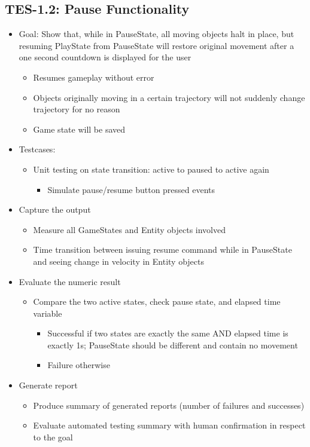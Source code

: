 \subsection{TES-1.2: Pause Functionality}
\label{subsec:pausefunc}
\begin{itemize}
\item Goal: Show that, while in PauseState, all moving objects halt in place, but resuming PlayState from PauseState will restore original movement after a one second countdown is displayed for the user
\begin{itemize}
\item Resumes gameplay without error
\item Objects originally moving in a certain trajectory will not suddenly change trajectory for no reason
\item Game state will be saved
\end{itemize}

\item Testcases:
\begin{itemize}
\item Unit testing on state transition: active to paused to active again
\begin{itemize}
\item Simulate pause/resume button pressed events
\end{itemize}
\end{itemize}

\item Capture the output
\begin{itemize}
\item Measure all GameStates and Entity objects involved
\item Time transition between issuing resume command while in PauseState and seeing change in velocity in Entity objects
\end{itemize}

\item Evaluate the numeric result
\begin{itemize}
\item Compare the two active states, check pause state, and elapsed time variable
\begin{itemize}
\item Successful if two states are exactly the same AND elapsed time is exactly 1s; PauseState should be different and contain no movement
\item Failure otherwise
\end{itemize}
\end{itemize}

\item Generate report
\begin{itemize}
\item Produce summary of generated reports (number of failures and successes)
\item Evaluate automated testing summary with human confirmation in respect to the goal
\end{itemize}
\end{itemize}

